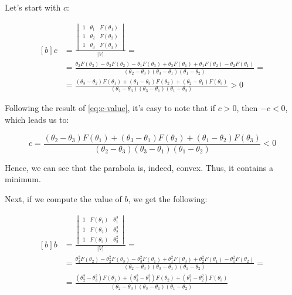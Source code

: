 \documentclass[11pt,a4paper]{article}
\begin{document}
Let's start with $c$:

\begin{equation}
  \label{eq:c-value}
  \begin{aligned}[b]
    c &=
    \frac{
      \begin{vmatrix}
        1 & \theta_1 & F(\theta_1) \\
        1 & \theta_2 & F(\theta_2) \\
        1 & \theta_3 & F(\theta_3)
      \end{vmatrix}
    }
    {|V|} = \\
  &=
  \frac{
    \theta_2F(\theta_3) - \theta_3F(\theta_2) - \theta_1F(\theta_3) + \theta_3F(\theta_1) + \theta_1F(\theta_2) - \theta_2F(\theta_1)
  }{
    (\theta_2 - \theta_3)(\theta_3 - \theta_1)(\theta_1 - \theta_2)
  } = \\
  &=
  \frac{
    (\theta_3 - \theta_2)F(\theta_1) + (\theta_1 - \theta_3)F(\theta_2) + (\theta_2 - \theta_1)F(\theta_3)
  }{
    (\theta_2 - \theta_3)(\theta_3 - \theta_1)(\theta_1 - \theta_2)
  } > 0
  \end{aligned}
\end{equation}

Following the result of \eqref{eq:c-value}, it's easy to note that if $c > 0$, then $-c < 0$, which leads
us to:

\[
  c = \frac{
    (\theta_2 - \theta_3)F(\theta_1) + (\theta_3 - \theta_1)F(\theta_2) + (\theta_1 - \theta_2)F(\theta_3)
  }{
    (\theta_2 - \theta_3)(\theta_3 - \theta_1)(\theta_1 - \theta_2)
  } < 0
\]

Hence, we can see that the parabola is, indeed, convex. Thus, it contains a minimum.

Next, if we compute the value of $b$, we get the following:

\begin{equation*}
  \begin{aligned}[b]
    b &=
    \frac{
      \begin{vmatrix}
        1 & F(\theta_1) & \theta_1^2 \\
        1 & F(\theta_2) & \theta_2^2 \\
        1 & F(\theta_3) & \theta_3^2
      \end{vmatrix}
    }
    {|V|} = \\
  &=
  \frac{
    \theta_3^2F(\theta_2) - \theta_2^2F(\theta_3) - \theta_3^2F(\theta_1) + \theta_1^2F(\theta_3) + \theta_2^2F(\theta_1) - \theta_1^2F(\theta_2)
  }{
    (\theta_2 - \theta_3)(\theta_3 - \theta_1)(\theta_1 - \theta_2)
  } = \\
  &=
  \frac{
    (\theta_2^2 - \theta_3^2)F(\theta_1) + (\theta_3^2 - \theta_1^2)F(\theta_2) + (\theta_1^2 - \theta_2^2)F(\theta_3)
  }{
    (\theta_2 - \theta_3)(\theta_3 - \theta_1)(\theta_1 - \theta_2)
  }
  \end{aligned}
\end{equation*}
\end{document}
